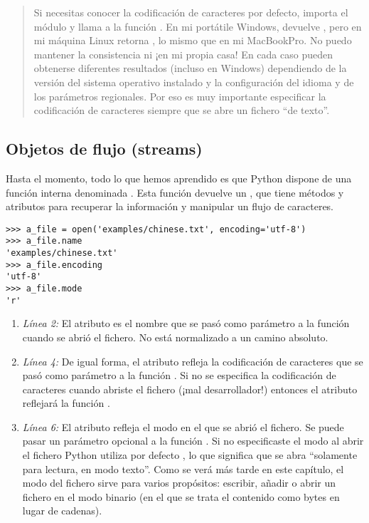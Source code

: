 \begin{quote}
Si necesitas conocer la codificación de caracteres por defecto, importa el módulo  y llama a la función . En mi portátile Windows, devuelve , pero en mi máquina Linux retorna , lo mismo que en mi MacBookPro. No puedo mantener la consistencia ni ¡en mi propia casa! En cada caso pueden obtenerse diferentes resultados (incluso en Windows) dependiendo de la versión del sistema operativo instalado y la configuración del idioma y de los parámetros regionales. Por eso es muy importante especificar la codificación de caracteres siempre que se abre un fichero ``de texto''.
\end{quote}

\subsection{Objetos de flujo (streams)}

Hasta el momento, todo lo que hemos aprendido es que Python dispone de una función interna denominada . Esta función devuelve un , que tiene métodos y atributos para recuperar la información y manipular un flujo de caracteres.

\noindent\begin{minipage}{\textwidth}
\begin{lstlisting}[mathescape=True]
>>> a_file = open('examples/chinese.txt', encoding='utf-8')
>>> a_file.name
'examples/chinese.txt'
>>> a_file.encoding
'utf-8'
>>> a_file.mode
'r'
\end{lstlisting}
\end{minipage}

\begin{enumerate}

\item \emph{Línea 2:} El atributo  es el nombre que se pasó como parámetro a la función  cuando se abrió el fichero. No está normalizado a un camino absoluto.

\item \emph{Línea 4:} De igual forma, el atributo  refleja la codificación de caracteres que se pasó como parámetro a la función . Si no se especifica la codificación de caracteres cuando abriste el fichero (¡mal desarrollador!) entonces el atributo reflejará la función .

\item \emph{Línea 6:} El atributo  refleja el modo en el que se abrió el fichero. Se puede pasar un parámetro opcional  a la función . Si no especificaste el modo al abrir el fichero Python utiliza por defecto , lo que significa que se abra ``solamente para lectura, en modo texto''. Como se verá más tarde en este capítulo, el modo del fichero sirve para varios propósitos: escribir, añadir o abrir un fichero en el modo binario (en el que se trata el contenido como bytes en lugar de cadenas).

\end{enumerate}
 
